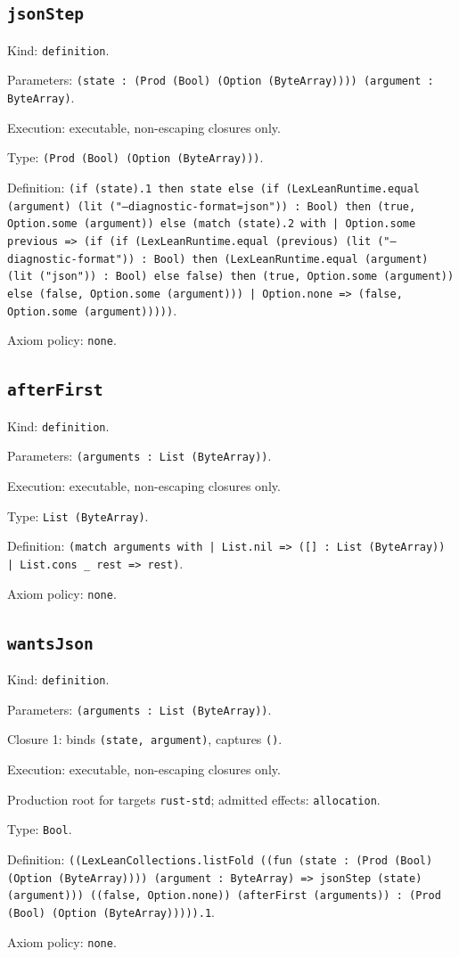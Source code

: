 \documentclass[11pt]{article}
\begin{document}
\subsection*{\texttt{jsonStep}}
\noindent Kind: \texttt{definition}.\par
\noindent Parameters: \texttt{(state : (Prod (Bool) (Option (ByteArray)))) (argument : ByteArray)}.\par
\noindent Execution: executable, non-escaping closures only.\par
\noindent Type: \texttt{(Prod (Bool) (Option (ByteArray)))}.\par
\noindent Definition: \texttt{(if (state).1 then state else (if (LexLeanRuntime.equal (argument) (lit ("--diagnostic-format=json")) : Bool) then (true, Option.some (argument)) else (match (state).2 with | Option.some previous => (if (if (LexLeanRuntime.equal (previous) (lit ("--diagnostic-format")) : Bool) then (LexLeanRuntime.equal (argument) (lit ("json")) : Bool) else false) then (true, Option.some (argument)) else (false, Option.some (argument))) | Option.none => (false, Option.some (argument)))))}.\par
\noindent Axiom policy: \texttt{none}.\par
\subsection*{\texttt{afterFirst}}
\noindent Kind: \texttt{definition}.\par
\noindent Parameters: \texttt{(arguments : List (ByteArray))}.\par
\noindent Execution: executable, non-escaping closures only.\par
\noindent Type: \texttt{List (ByteArray)}.\par
\noindent Definition: \texttt{(match arguments with | List.nil => ([] : List (ByteArray)) | List.cons \_ rest => rest)}.\par
\noindent Axiom policy: \texttt{none}.\par
\subsection*{\texttt{wantsJson}}
\noindent Kind: \texttt{definition}.\par
\noindent Parameters: \texttt{(arguments : List (ByteArray))}.\par
\noindent Closure 1: binds \texttt{(state, argument)}, captures \texttt{()}.\par
\noindent Execution: executable, non-escaping closures only.\par
\noindent Production root for targets \texttt{rust-std}; admitted effects: \texttt{allocation}.\par
\noindent Type: \texttt{Bool}.\par
\noindent Definition: \texttt{((LexLeanCollections.listFold ((fun (state : (Prod (Bool) (Option (ByteArray)))) (argument : ByteArray) => jsonStep (state) (argument))) ((false, Option.none)) (afterFirst (arguments)) : (Prod (Bool) (Option (ByteArray))))).1}.\par
\noindent Axiom policy: \texttt{none}.\par
\end{document}
